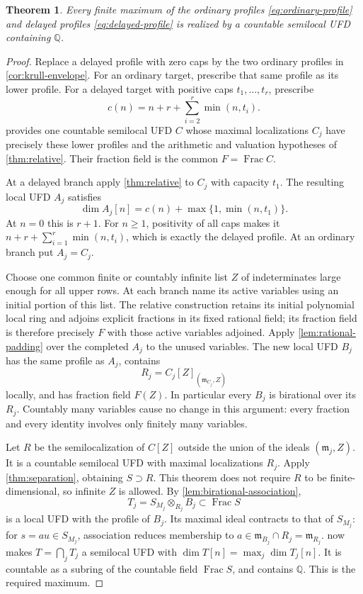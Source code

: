 \documentclass[11pt,reqno]{amsart}
\numberwithin{equation}{section}
\theoremstyle{plain}
\newtheorem{theorem}{Theorem}[section]
\theoremstyle{definition}
\theoremstyle{remark}
\begin{document}
\begin{theorem}\label{thm:mixed}
Every finite maximum of the ordinary profiles
\eqref{eq:ordinary-profile} and delayed profiles
\eqref{eq:delayed-profile} is realized by a countable semilocal
UFD containing \(\mathbb Q\).
\end{theorem}
\begin{proof}
Replace a delayed profile with zero caps by the two ordinary
profiles in \cref{cor:krull-envelope}. For an ordinary target,
prescribe that same profile as its lower profile. For a delayed
target with positive caps \(t_1,\ldots,t_r\), prescribe
\[
 c(n)=n+r+\sum_{i=2}^r\min(n,t_i).
\]
 provides one countable semilocal UFD \(C\)
whose maximal localizations \(C_j\) have precisely these lower
profiles and the arithmetic and valuation hypotheses of
\cref{thm:relative}. Their fraction field is the common
\(F=\operatorname{Frac}C\).

At a delayed branch apply \cref{thm:relative} to \(C_j\) with
capacity \(t_1\). The resulting local UFD \(A_j\) satisfies
\[
 \dim A_j[n]=c(n)+\max\{1,\min(n,t_1)\}.
\]
At \(n=0\) this is \(r+1\). For \(n\ge1\), positivity
of all caps makes it
\(n+r+\sum_{i=1}^r\min(n,t_i)\), which is exactly the
delayed profile. At an ordinary branch put \(A_j=C_j\).

Choose one common finite or countably infinite list \(Z\) of
indeterminates large enough for all upper rows. At each branch
name its active variables using an initial portion of this list.
The relative construction retains its initial polynomial local
ring and adjoins explicit fractions in its fixed rational field;
its fraction field is therefore precisely \(F\) with those
active variables adjoined. Apply \cref{lem:rational-padding}
over the completed \(A_j\) to the unused variables. The new
local UFD \(B_j\) has the same profile as \(A_j\), contains
\[
 R_j=C_j[Z]_{(\mathfrak m_{C_j},Z)}
\]
locally, and has fraction field \(F(Z)\). In particular every
\(B_j\) is birational over its \(R_j\). Countably many
variables cause no change in this argument: every fraction
and every identity involves only finitely many variables.

Let \(R\) be the semilocalization of \(C[Z]\) outside the
union of the ideals \((\mathfrak m_j,Z)\). It is a countable
semilocal UFD with maximal localizations \(R_j\). Apply
\cref{thm:separation}, obtaining \(S\supset R\). This theorem
does not require \(R\) to be finite-dimensional, so infinite
\(Z\) is allowed. By \cref{lem:birational-association},
\[
 T_j=S_{M_j}\otimes_{R_j}B_j\subset\operatorname{Frac}S
\]
is a local UFD with the profile of \(B_j\). Its maximal ideal
contracts to that of \(S_{M_j}\): for \(s=au\in S_{M_j}\),
association reduces membership to \(a\in\mathfrak m_{B_j}
\cap R_j=\mathfrak m_{R_j}\).
 now makes \(T=\bigcap_jT_j\) a
semilocal UFD with
\(\dim T[n]=\max_j\dim T_j[n]\). It is countable as a
subring of the countable field \(\operatorname{Frac}S\), and
contains \(\mathbb Q\). This is the required maximum.
\end{proof}
\end{document}
